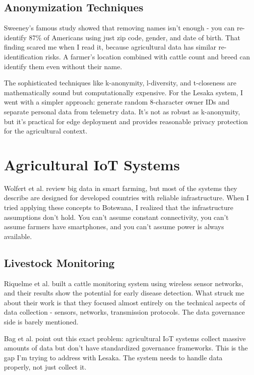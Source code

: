 \subsection{Anonymization Techniques}

Sweeney's famous study \cite{sweeney2002k} showed that removing names isn't enough - you can re-identify 87\% of Americans using just zip code, gender, and date of birth. That finding scared me when I read it, because agricultural data has similar re-identification risks. A farmer's location combined with cattle count and breed can identify them even without their name.

The sophisticated techniques like k-anonymity, l-diversity, and t-closeness \cite{sweeney2002k, machanavajjhala2007diversity, li2007t} are mathematically sound but computationally expensive. For the Lesaka system, I went with a simpler approach: generate random 8-character owner IDs and separate personal data from telemetry data. It's not as robust as k-anonymity, but it's practical for edge deployment and provides reasonable privacy protection for the agricultural context.

\section{Agricultural IoT Systems}

Wolfert et al. \cite{wolfert2017big} review big data in smart farming, but most of the systems they describe are designed for developed countries with reliable infrastructure. When I tried applying these concepts to Botswana, I realized that the infrastructure assumptions don't hold. You can't assume constant connectivity, you can't assume farmers have smartphones, and you can't assume power is always available.

\subsection{Livestock Monitoring}

Riquelme et al. \cite{riquelme2018smonitor} built a cattle monitoring system using wireless sensor networks, and their results show the potential for early disease detection. What struck me about their work is that they focused almost entirely on the technical aspects of data collection - sensors, networks, transmission protocols. The data governance side is barely mentioned.

Bag et al. \cite{bag2019smart} point out this exact problem: agricultural IoT systems collect massive amounts of data but don't have standardized governance frameworks. This is the gap I'm trying to address with Lesaka. The system needs to handle data properly, not just collect it.

